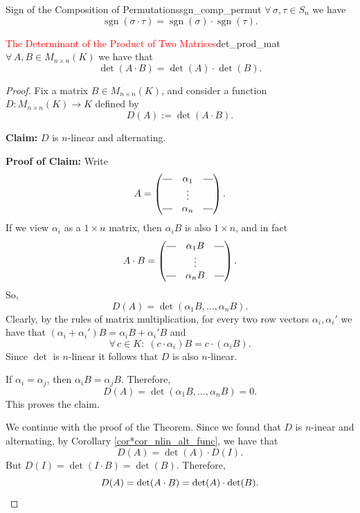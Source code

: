 \begin{lemma}{Sign of the Composition of Permutations}{sgn_comp_permut}
	$\forall \, \sigma, \tau \in S_n$ we have 
	\[
		\operatorname{sgn}(\sigma \cdot \tau) = \operatorname{sgn}(\sigma)\cdot \operatorname{sgn}(\tau).
	\]
\end{lemma}

\begin{theorem}{\textcolor{red}{The Determinant of the Product of Two Matrices}}{det_prod_mat}
	$\forall \, A,B \in M_{n\times n}(K)$ we have that
	\[
		\det(A\cdot B) = \det(A) \cdot \det(B).
	\]
\end{theorem}

\begin{proof}
	Fix a matrix $B \in M_{n\times n}(K)$, and consider a function $D:M_{n\times n}(K) \to K$ defined by
	\[
		D(A) := \det(A\cdot B).
	\]
	
	\textbf{Claim:} $D$ is $n$-linear and alternating.
	
	\textbf{Proof of Claim:} Write
	\[
		A = \begin{pmatrix}
			\rule[0.5ex]{1em}{0.4pt} & \alpha_1 & \rule[0.5ex]{1em}{0.4pt}\\
			& \vdots & \\
			\rule[0.5ex]{1em}{0.4pt} & \alpha_n & \rule[0.5ex]{1em}{0.4pt}
		\end{pmatrix}.
	\]
	If we view $\alpha_i$ as a $1 \times n$ matrix, then $\alpha_i B$ is also $1 \times n$, and in fact
	\[
		A\cdot B = \begin{pmatrix}
			\rule[0.5ex]{1em}{0.4pt} & \alpha_1 B & \rule[0.5ex]{1em}{0.4pt}\\
			& \vdots & \\
			\rule[0.5ex]{1em}{0.4pt} & \alpha_n B & \rule[0.5ex]{1em}{0.4pt}
		\end{pmatrix}.
	\]
	So, 
	\[
		D(A) = \det(\alpha_1 B, \hdots, \alpha_n B).
	\]
	Clearly, by the rules of matrix multiplication, for every two row vectors $\alpha_i, \alpha_i'$ we have that $(\alpha_i + \alpha_i') B = \alpha_i B + \alpha_i' B$ and
	\[
		\forall \, c\in K : \; (c \cdot \alpha_i) B = c \cdot (\alpha_i B).
	\]
	Since $\det$ is $n$-linear it follows that $D$ is also $n$-linear.
	
	If $\alpha_i = \alpha_j$, then $\alpha_i B = \alpha_j B$. Therefore, 
	\[
		D(A) = \det(\alpha_1 B, \hdots, \alpha_n B) = 0.
	\]
	This proves the claim.
	
	We continue with the proof of the Theorem. Since we found that $D$ is $n$-inear and alternating, by Corollary \ref{cor*cor_nlin_alt_func}, we have that
	\[
		D(A) = \det(A)\cdot D(I).
	\]
	But $D(I) = \det(I\cdot B) = \det(B)$. Therefore, 
	\[
		D(A) = \det(A \cdot B) = \det(A)\cdot \det(B). \qedhere
	\]
\end{proof}

